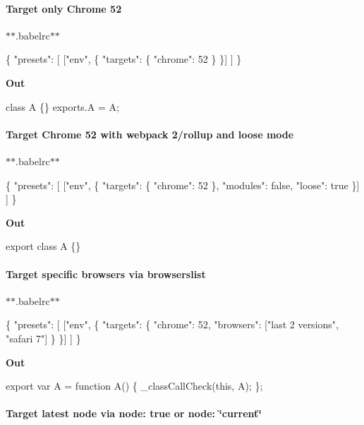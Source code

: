 \paragraph*{Target only Chrome 52}

$\ast$$\ast$.babelrc$\ast$$\ast$


\begin{DoxyCode}
\{
  "presets": [
    ["env", \{
      "targets": \{
        "chrome": 52
      \}
    \}]
  ]
\}
\end{DoxyCode}


{\bfseries Out}


\begin{DoxyCode}
class A \{\}
exports.A = A;
\end{DoxyCode}


\paragraph*{Target Chrome 52 with webpack 2/rollup and loose mode}

$\ast$$\ast$.babelrc$\ast$$\ast$


\begin{DoxyCode}
\{
  "presets": [
    ["env", \{
      "targets": \{
        "chrome": 52
      \},
      "modules": false,
      "loose": true
    \}]
  ]
\}
\end{DoxyCode}


{\bfseries Out}


\begin{DoxyCode}
export class A \{\}
\end{DoxyCode}


\paragraph*{Target specific browsers via browserslist}

$\ast$$\ast$.babelrc$\ast$$\ast$


\begin{DoxyCode}
\{
  "presets": [
    ["env", \{
      "targets": \{
        "chrome": 52,
        "browsers": ["last 2 versions", "safari 7"]
      \}
    \}]
  ]
\}
\end{DoxyCode}


{\bfseries Out}


\begin{DoxyCode}
export var A = function A() \{
  \_classCallCheck(this, A);
\};
\end{DoxyCode}


\paragraph*{Target latest node via {\ttfamily node\+: true} or {\ttfamily node\+: \char`\"{}current\char`\"{}}}

